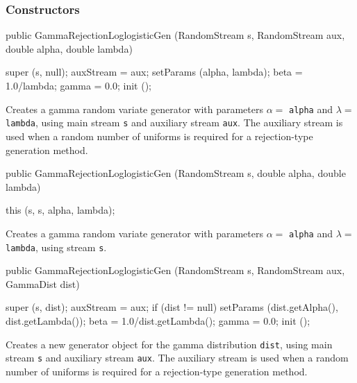 \subsubsection* {Constructors}
\begin{code}

   public GammaRejectionLoglogisticGen (RandomStream s, RandomStream aux,
                                        double alpha, double lambda) \begin{hide} {
      super (s, null);
      auxStream = aux;
      setParams (alpha, lambda);
      beta  = 1.0/lambda;
      gamma = 0.0;
      init ();
   }\end{hide}
\end{code} 
\begin{tabb} Creates a gamma random variate generator with parameters $\alpha =$ 
 \texttt{alpha} and $\lambda =$ \texttt{lambda}, using main stream \texttt{s} and 
  auxiliary stream \texttt{aux}.
 The auxiliary stream is used when a random number of uniforms
 is required for a rejection-type generation method.
\end{tabb}
\begin{code}

   public GammaRejectionLoglogisticGen (RandomStream s,
                                        double alpha, double lambda) \begin{hide} {
      this (s, s, alpha, lambda);
   }\end{hide}
\end{code} 
\begin{tabb} Creates a gamma random variate generator with parameters $\alpha =$ 
 \texttt{alpha} and $\lambda =$ \texttt{lambda}, using stream \texttt{s}.
\end{tabb}
\begin{code}

   public GammaRejectionLoglogisticGen (RandomStream s, RandomStream aux, 
                                        GammaDist dist) \begin{hide} {
      super (s, dist);
      auxStream = aux;
      if (dist != null)
         setParams (dist.getAlpha(), dist.getLambda());
      beta  = 1.0/dist.getLambda();
      gamma = 0.0;
      init ();
   }\end{hide}
\end{code}
  \begin{tabb}  Creates a new generator object for the gamma 
    distribution \texttt{dist}, using main stream \texttt{s} and 
    auxiliary stream \texttt{aux}. 
    The auxiliary stream is used when a random number of uniforms
    is required for a rejection-type generation method.
  \end{tabb}
